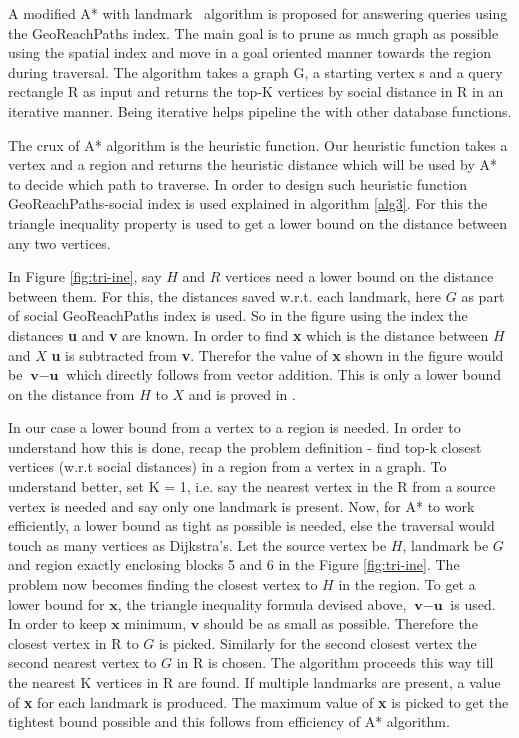 A modified A* with landmark~\cite{AC2005} algorithm is proposed for answering {\rrp} queries using the GeoReachPaths index. The main goal is to prune as much graph as possible using the spatial index and move in a goal oriented manner towards the region during traversal. The algorithm takes a graph G, a starting vertex s and a query rectangle R as input and returns the top-K vertices by social distance in R in an iterative manner. Being iterative helps pipeline the {\rrp} with other database functions.

The crux of A* algorithm is the heuristic function. Our heuristic function takes a vertex and a region and returns the heuristic distance which will be used by A* to decide which path to traverse. In order to design such heuristic function GeoReachPaths-social index is used explained in algorithm \ref{alg3}. For this the triangle inequality property is used to get a lower bound on the distance between any two vertices.

In Figure \ref{fig:tri-ine}, say $H$ and $R$ vertices need a lower bound on the distance between them. For this, the distances saved w.r.t. each landmark, here $G$ as part of social GeoReachPaths index is used. So in the figure using the index the distances \textbf{u} and \textbf{v} are known. In order to find \textbf{x} which is the distance between $H$ and $X$ \textbf{u} is subtracted from \textbf{v}. Therefor the value of \textbf{x} shown in the figure would be $\textbf{v} - \textbf{u}$ which directly follows from vector addition. This is only a lower bound on the distance from $H$ to $X$ and is proved in \cite{AC2005}.

In our case a lower bound from a vertex to a region is needed. In order to understand how this is done, recap the problem definition - find top-k closest vertices (w.r.t social distances) in a region from a vertex in a graph. To understand better, set K = 1, i.e. say the nearest vertex in the R from a source vertex is needed and say only one landmark is present. Now, for A* to work efficiently, a lower bound as tight as possible is needed, else the traversal would touch as many vertices as Dijkstra's. Let the source vertex be $H$, landmark be $G$ and region exactly enclosing blocks 5 and 6 in the Figure \ref{fig:tri-ine}. The problem now becomes finding the closest vertex to $H$ in the region. To get a lower bound for $\textbf{x}$, the triangle inequality formula devised above, $\textbf{v} - \textbf{u}$ is used. In order to keep $\textbf{x}$ minimum, $\textbf{v}$ should be as small as possible. Therefore the closest vertex in R to $G$ is picked. Similarly for the second closest vertex the second nearest vertex to $G$ in R is chosen. The algorithm proceeds this way till the nearest K vertices in R are found. If multiple landmarks are present, a value of \textbf{x} for each landmark is produced. The maximum value of \textbf{x} is picked to get the tightest bound possible and this follows from efficiency of A* algorithm.

